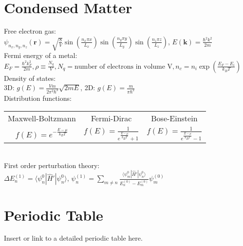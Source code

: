 \documentclass[12pt,a4paper]{article}
\begin{document}
\section*{Condensed Matter}
Free electron gas:\\[.15in]
$\psi_{n_x, n_y, n_z}(\mathbf{r}) = \sqrt{\frac{8}{V}} \sin\left(\frac{n_x \pi x}{L_x}\right) \sin\left(\frac{n_y \pi y}{L_y}\right) \sin\left(\frac{n_z \pi z}{L_z}\right)
$, \hspace*{5pt} $E(\mathbf{k}) = \frac{\hbar^2 k^2}{2m}
$\\[.15in]
Fermi energy of a metal:\\[.15in]
$E_F = \frac{\hbar^2 k_F^2}{2m}, \rho \equiv \frac{N_q}{V}, N_q = \text{number of electrons in volume V}, n_c = n_i \exp (\frac{E_F - E_i}{k_B T})$\\[.15in]
Density of states:\\[.15in]
3D: $g(E) = \frac{V m}{2\pi^2 \hbar^3} \sqrt{2mE}$, 2D: $g(E) = \frac{m}{\pi \hbar^2}$\\[.15in]
Distribution functions:\\
\begin{tabular}{ccc}
	Maxwell-Boltzmann & Fermi-Dirac & Bose-Einstein\\
	$f(E) = e^{-\frac{E - \mu}{k_B T}}$ & $f(E) = \frac{1}{e^{\frac{E - \mu}{k_B T}} + 1}$ & $f(E) = \frac{1}{e^{\frac{E - \mu}{k_B T}} - 1}
	$\\[.15in]
\end{tabular}\\[.15in]
First order perturbation theory:\\[.15in]
$\Delta E_n^{(1)} = \langle \psi_n^0 | \hat{H}' | \psi_n^0 \rangle$,
$\psi_n^{(1)} = \sum_{m \neq n} \frac{\langle \psi_m^0 | \hat{H}' | \psi_n^0 \rangle}{E_n^{(0)} - E_m^{(0)}} \psi_m^{(0)}$

	
	
	\section*{Periodic Table}
	Insert or link to a detailed periodic table here.
	
\end{document}
